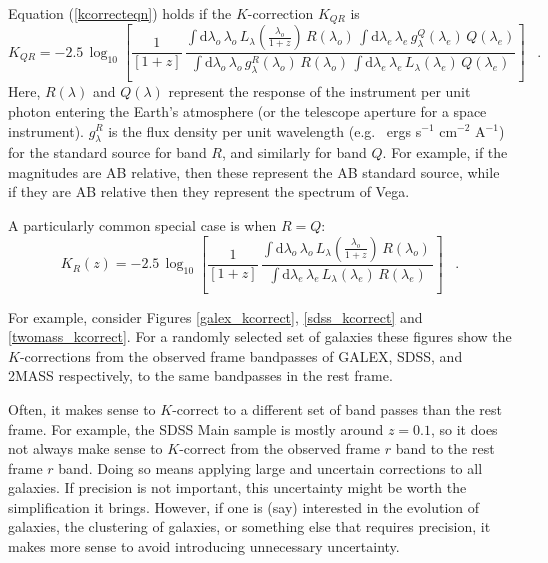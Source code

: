 \documentclass[12pt,preprint]{aastex}
\newcommand{\lambdaobs}{\lambda_o}
\newcommand{\lambdaemit}{\lambda_e}
\renewcommand{\AA}{A}
\begin{document}
Equation (\ref{kcorrecteqn}) holds if the $K$-correction $K_{QR}$ is
\begin{equation}
\label{eq:wavelengthL}
K_{QR} = -2.5\,\log_{10}\left[\frac{1}{[1+z]}\,
  \frac{\displaystyle
  \int\mathrm{d}\lambdaobs\,\lambdaobs\,L_{\lambda}\!\left(\frac{\lambdaobs}{1+z}\right)\,R(\lambdaobs)\,
    \int\mathrm{d}\lambdaemit\,\lambdaemit\,
    g^Q_{\lambda}(\lambdaemit)\,Q(\lambdaemit)}
       {\displaystyle
  \int\mathrm{d}\lambdaobs\,\lambdaobs\,g^R_{\lambda}(\lambdaobs)\,R(\lambdaobs)\,
    \int\mathrm{d}\lambdaemit\,\lambdaemit\,
    L_{\lambda}(\lambdaemit)\,Q(\lambdaemit)}
\right] \;\;\;.
\end{equation}
Here, $R(\lambda)$ and $Q(\lambda)$ represent the response of the
instrument per unit photon entering the Earth's atmosphere (or the
telescope aperture for a space instrument).  $g^R_\lambda$ is the flux
density per unit wavelength (e.g.~ ergs s$^{-1}$ cm$^{-2}$ \AA$^{-1}$)
for the standard source for band $R$, and similarly for band $Q$. For
example, if the magnitudes are AB relative, then these represent the
AB standard source, while if they are AB relative then they represent
the spectrum of Vega. 

A particularly common special case is when $R=Q$:
\begin{equation}
\label{eq:specialL}
K_R(z) = -2.5\,\log_{10}\left[\frac{1}{[1+z]}\,
  \frac{\displaystyle
  \int\mathrm{d}\lambdaobs\,\lambdaobs\,L_{\lambda}\!\left(\frac{\lambdaobs}{1+z}\right)\,R(\lambdaobs)\,}
       {\displaystyle
    \int\mathrm{d}\lambdaemit\,\lambdaemit\,
    L_{\lambda}(\lambdaemit)\,R(\lambdaemit)}
\right] \;\;\;.
\end{equation}

For example, consider Figures \ref{galex_kcorrect},
\ref{sdss_kcorrect} and \ref{twomass_kcorrect}. For a randomly
selected set of galaxies these figures show the $K$-corrections from
the observed frame bandpasses of GALEX, SDSS, and 2MASS respectively,
to the same bandpasses in the rest frame.

Often, it makes sense to $K$-correct to a different set of band passes
than the rest frame. For example, the SDSS Main sample is mostly
around $z=0.1$, so it does not always make sense to $K$-correct from
the observed frame $r$ band to the rest frame $r$ band. Doing so means
applying large and uncertain corrections to all galaxies. If precision
is not important, this uncertainty might be worth the simplification
it brings. However, if one is (say) interested in the evolution of
galaxies, the clustering of galaxies, or something else that requires
precision, it makes more sense to avoid introducing unnecessary
uncertainty.
\end{document}
